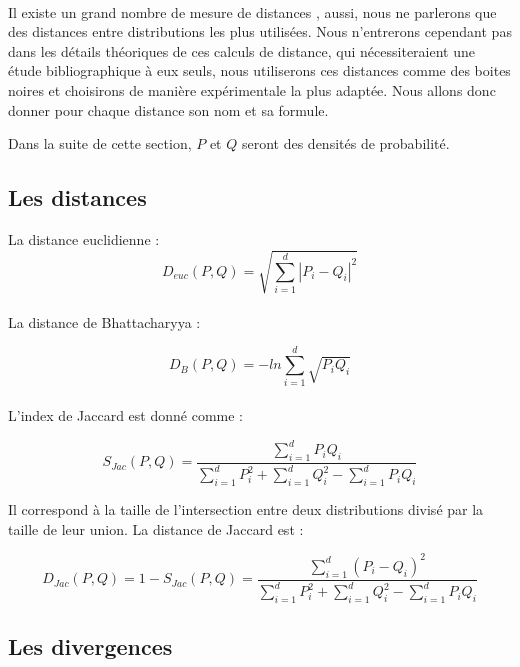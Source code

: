 \documentclass[utf8,final]{stageM2R} %
\begin{document}
\paragraph{}

 Il existe un grand nombre de mesure de distances \autocite{cha2007comprehensive}, aussi, nous ne parlerons que des distances entre distributions les plus utilisées. Nous n'entrerons cependant pas dans les détails théoriques de ces calculs de distance, qui nécessiteraient une étude bibliographique à eux seuls, nous utiliserons ces distances comme des boites noires et choisirons de manière expérimentale la plus adaptée. Nous allons donc donner pour chaque distance son nom et sa formule.

Dans la suite de cette section, $P$ et $Q$ seront des densités de probabilité.

\subsection{Les distances}

La distance euclidienne : 
\begin{equation}
  D_{euc}(P,Q) = \sqrt{\sum\limits_{i=1}^{d}|P_{i} - Q_{i}|^2}
\end{equation}
\\
La distance de Bhattacharyya :

\begin{equation}
  D_{B}(P,Q) = -ln\sum\limits_{i=1}^{d} \sqrt{P_{i}Q_{i}}
\end{equation}
\\
L'index de Jaccard est donné comme : 

\begin{equation}
  S_{Jac}(P,Q) = \frac{\sum\limits_{i=1}^{d} P_{i}Q_{i}}{\sum\limits_{i=1}^{d} P^{2}_{i} + \sum\limits_{i=1}^{d} Q_{i}^{2} - \sum\limits_{i=1}^{d} P_{i}Q_{i}}
\end{equation}

Il correspond à la taille de l'intersection entre deux distributions divisé par la taille de leur union. La distance de Jaccard est :

\begin{equation}
  D_{Jac}(P,Q) = 1 - S_{Jac}(P,Q) = \frac{\sum\limits_{i=1}^{d} (P_{i} - Q_{i})^2}{\sum\limits_{i=1}^{d} P^{2}_{i} + \sum\limits_{i=1}^{d} Q^{2}_{i} - \sum\limits_{i=1}^{d} P_{i}Q_{i}}
\end{equation}

\subsection{Les divergences}
\end{document}
